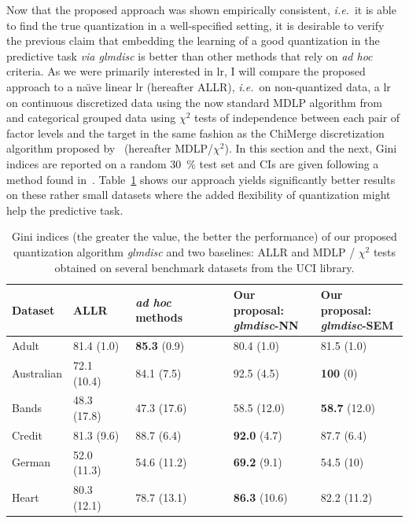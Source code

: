Now that the proposed approach was shown empirically consistent, \textit{i.e.}\ it is able to find the true quantization in a well-specified setting, it is desirable to verify the previous claim that embedding the learning of a good quantization in the predictive task \textit{via glmdisc} is better than other methods that rely on \textit{ad hoc} criteria. As we were primarily interested in \gls{lr}, I will compare the proposed approach to a na\"{\i}ve linear \gls{lr} (hereafter ALLR), \textit{i.e.}\ on non-quantized data, a \gls{lr} on continuous discretized data using the now standard MDLP algorithm from~\cite{fayyad1993multi} and categorical grouped data using $\chi^2$ tests of independence between each pair of factor levels and the target in the same fashion as the ChiMerge discretization algorithm proposed by~\cite{kerber1992chimerge} (hereafter MDLP/$\chi^2$). In this section and the next, Gini indices are reported on a random 30~\% test set and CIs are given following a method found in~\cite{sun2014fast}. Table~\ref{tab:banchmark} shows our approach yields significantly better results on these rather small datasets where the added flexibility of quantization might help the predictive task.

\begin{table}
    \centering
        \caption{Gini indices (the greater the value, the better the performance) of our proposed quantization algorithm \textit{glmdisc} and two baselines: ALLR and MDLP / $\chi^2$ tests obtained on several benchmark datasets from the UCI library.}
    \label{tab:banchmark}
\begin{small}
\begin{tabular}{lllll}
Dataset & ALLR & \textit{ad hoc} methods & \makecell{Our proposal:\\ \textit{glmdisc}-NN} & \makecell{Our proposal:\\ \textit{glmdisc}-SEM} \\
\hline
Adult & 81.4 (1.0) & \textbf{85.3} (0.9) & 80.4 (1.0) & 81.5 (1.0) \\
Australian & 72.1 (10.4) & 84.1 (7.5) & 92.5 (4.5) & \textbf{100} (0) \\
Bands & 48.3 (17.8) & 47.3 (17.6) & 58.5 (12.0) & \textbf{58.7} (12.0) \\
Credit & 81.3 (9.6) & 88.7 (6.4) & \textbf{92.0} (4.7) & 87.7 (6.4) \\
German & 52.0 (11.3) & 54.6 (11.2) & \textbf{69.2} (9.1) & 54.5 (10) \\
Heart & 80.3 (12.1) & 78.7 (13.1) & \textbf{86.3} (10.6) & 82.2 (11.2) 
\end{tabular}
\end{small}
\end{table}

